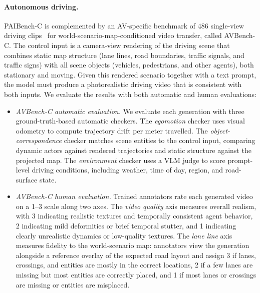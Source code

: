 \paragraph{Autonomous driving.}
PAIBench-C is complemented by an AV-specific benchmark of $486$ single-view driving clips~\citep{cosmos_predict2p5} for world-scenario-map-conditioned video transfer, called AVBench-C. The control input
is a camera-view rendering of the driving scene that combines static map structure (lane lines, road boundaries, traffic signals, and traffic signs) with all scene objects (vehicles, pedestrians, and other agents), both stationary and moving. Given this rendered scenario together with a text prompt, the model must produce a photorealistic driving video that is consistent with both inputs. We evaluate the results with both automatic and human evaluations:
\begin{itemize}
\item \textit{AVBench-C automatic evaluation.} We evaluate each generation with three ground-truth-based automatic checkers. The \emph{egomotion} checker uses visual odometry to compute trajectory drift per meter travelled. The \emph{object-correspondence} checker matches scene entities to the control input, comparing dynamic actors against rendered trajectories and static structure against the projected map. The \emph{environment} checker uses a VLM judge to score prompt-level driving conditions, including weather, time of day, region, and road-surface state.
\item \textit{AVBench-C human evaluation.} Trained annotators rate each generated video on a 1--3 scale along two axes. The \emph{video quality} axis measures overall realism, with 3 indicating realistic textures and temporally consistent agent behavior, 2 indicating mild deformities or brief temporal stutter, and 1 indicating clearly unrealistic dynamics or low-quality textures. The \emph{lane line} axis measures fidelity to the world-scenario map: annotators view the generation alongside a reference overlay of the expected road layout and assign 3 if lanes, crossings, and entities are mostly in the correct locations, 2 if a few lanes are missing but most entities are correctly placed, and 1 if most lanes or crossings are missing or entities are misplaced.
\end{itemize}



